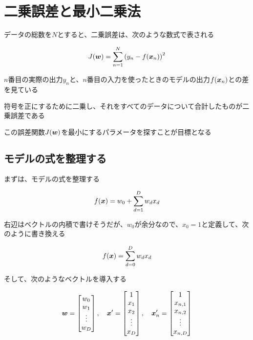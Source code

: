 \documentclass[../../../topic_machine-learning]{subfiles}
\begin{document}
\sectionline
\section{二乗誤差と最小二乗法}

データの総数を$N$とすると、二乗誤差は、次のような数式で表される

\begin{equation*}
  J(\vb*{w}) = \sum_{n=1}^N \left( y_n - f(\vb*{x}_n) \right)^2
\end{equation*}

$n$番目の実際の出力$y_n$と、$n$番目の入力を使ったときのモデルの出力$f(\vb*{x}_n)$との差を見ている

符号を正にするために二乗し、それをすべてのデータについて合計したものが二乗誤差である

\br

この誤差関数$J(\vb*{w})$を最小にするパラメータを探すことが目標となる

\subsection{モデルの式を整理する}

まずは、モデルの式を整理する

\begin{equation*}
  f(\vb*{x}) = w_0 + \sum_{d=1}^{D} w_d x_d
\end{equation*}

右辺はベクトルの内積で書けそうだが、$w_0$が余分なので、$x_0=1$と定義して、次のように書き換える

\begin{equation*}
  f(\vb*{x}) = \sum_{d=0}^{D} w_d x_d
\end{equation*}

そして、次のようなベクトルを導入する

\begin{equation*}
  \vb*{w} = \begin{bmatrix}
    w_0    \\
    w_1    \\
    \vdots \\
    w_D
  \end{bmatrix},\quad
  \vb*{x}' = \begin{bmatrix}
    1      \\
    x_1    \\
    x_2    \\
    \vdots \\
    x_D
  \end{bmatrix},\quad
  \vb*{x}'_n = \begin{bmatrix}
    1       \\
    x_{n,1} \\
    x_{n,2} \\
    \vdots  \\
    x_{n,D}
  \end{bmatrix}
\end{equation*}
\end{document}
